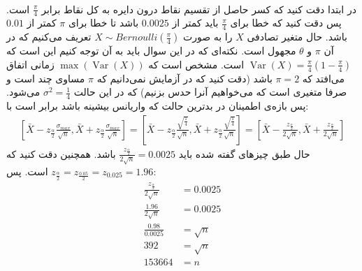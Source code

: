 \\
در ابتدا دقت کنید که کسر حاصل از تقسیم نقاط درون دایره به کل نقاط برابر
$\frac{\pi}{4}$
است. پس دقت کنید که خطا برای
$\frac{\pi}{4}$
باید کمتر از
$0.0025$
باشد تا خطا برای
$\pi$
کمتر از
$0.01$
باشد.
حال متغیر تصادفی
$X$
را به صورت 
$X \sim Bernoulli(\frac{\pi}{4})$
تعریف می‌کنیم که در آن
$\pi$ و $\theta$
مجهول است.
نکته‌ای که در این سوال باید به آن توجه کنیم این است که
$\operatorname{Var}(X) = \frac{\pi}{4} (1 - \frac{\pi}{4})$
است. مشخص است که
$\max(\operatorname{Var}(X))$
زمانی اتفاق می‌افتد که
$\pi = 2$
باشد
(دقت کنید که در آزمایش نمی‌دانیم که
$\pi$
مساوی چند است و صرفا متغیری است که می‌خواهیم آنرا حدس بزنیم)
 که در این حالت
$\sigma^2 = \frac{1}{4}$
می‌شود.
پس بازه‌ی اطمینان در بدترین حالت که واریانس بیشینه باشد برابر است با:
\begin{gather*}
    \left[\bar{X}- z_{\frac{\alpha}{2}} \frac{\sigma_{max}}{\sqrt{n}} , \bar{X}+ z_{\frac{\alpha}{2}} \frac{\sigma_{max}}{\sqrt{n}}\right] = 
    \left[\bar{X}- z_{\frac{\alpha}{2}} \frac{\sqrt{\frac{1}{4}}}{\sqrt{n}} , \bar{X}+ z_{\frac{\alpha}{2}} \frac{\sqrt{\frac{1}{4}}}{\sqrt{n}}\right] =
    \left[\bar{X}- \frac{z_{\frac{\alpha}{2}}}{2\sqrt{n}} , \bar{X}+ \frac{z_{\frac{\alpha}{2}}}{2\sqrt{n}}\right]
\end{gather*}
حال طبق چیز‌های گفته شده باید
$\frac{z_{\frac{\alpha}{2}}}{2\sqrt{n}} = 0.0025$
باشد. همچنین دقت کنید که
$z_{\frac{\alpha}{2}} = z_{\frac{0.05}{2}} = z_{0.025} = 1.96$
است. پس:
\begin{align*}
    \frac{z_{\frac{\alpha}{2}}}{2\sqrt{n}} &= 0.0025\\
    \frac{1.96}{2\sqrt{n}} &= 0.0025\\
    \frac{0.98}{0.0025} &= \sqrt{n}\\
    392 &= \sqrt{n}\\
    153664 &= n
\end{align*}
